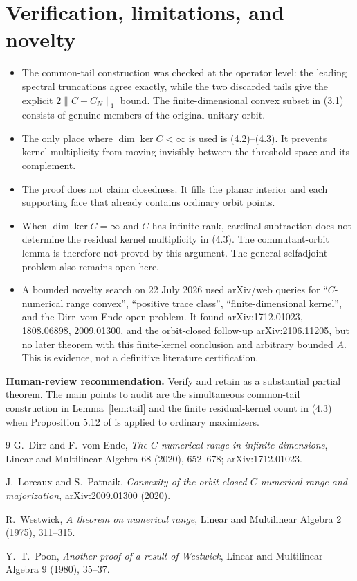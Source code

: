\documentclass[11pt]{article}
\begin{document}
\section{Verification, limitations, and novelty}

\begin{itemize}
\item The common-tail construction was checked at the operator level: the
leading spectral truncations agree exactly, while the two discarded tails
give the explicit $2\|C-C_N\|_1$ bound.  The finite-dimensional convex subset
in (3.1) consists of genuine members of the original unitary orbit.
\item The only place where $\dim\ker C<\infty$ is used is (4.2)--(4.3).
It prevents kernel multiplicity from moving invisibly between the threshold
space and its complement.
\item The proof does not claim closedness.  It fills the planar interior and
each supporting face that already contains ordinary orbit points.
\item When $\dim\ker C=\infty$ and $C$ has infinite rank, cardinal
subtraction does not determine the residual kernel multiplicity in (4.3).
The commutant-orbit lemma is therefore not proved by this argument.  The
general selfadjoint problem also remains open here.
\item A bounded novelty search on 22 July 2026 used arXiv/web queries for
``$C$-numerical range convex'', ``positive trace class'',
``finite-dimensional kernel'', and the Dirr--vom Ende open problem.  It found
arXiv:1712.01023, 1808.06898, 2009.01300, and the orbit-closed follow-up
arXiv:2106.11205, but no later theorem with this finite-kernel conclusion and
arbitrary bounded $A$.  This is evidence, not a definitive literature
certification.
\end{itemize}

\noindent\textbf{Human-review recommendation.}
Verify and retain as a substantial partial theorem.  The main points to audit
are the simultaneous common-tail construction in Lemma~\ref{lem:tail} and the
finite residual-kernel count in (4.3) when Proposition 5.12 of
\cite{LP} is applied to ordinary maximizers.

\begin{thebibliography}{9}
G.~Dirr and F.~vom Ende,
\emph{The $C$-numerical range in infinite dimensions},
Linear and Multilinear Algebra 68 (2020), 652--678;
arXiv:1712.01023.

J.~Loreaux and S.~Patnaik,
\emph{Convexity of the orbit-closed $C$-numerical range and majorization},
arXiv:2009.01300 (2020).

R.~Westwick,
\emph{A theorem on numerical range},
Linear and Multilinear Algebra 2 (1975), 311--315.

Y.~T.~Poon,
\emph{Another proof of a result of Westwick},
Linear and Multilinear Algebra 9 (1980), 35--37.
\end{thebibliography}
\end{document}
